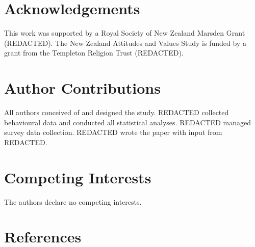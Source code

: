 \documentclass[
  man,floatsintext]{apa6}
\begin{document}
\newpage
\nolinenumbers

\hypertarget{acknowledgements}{%
\section{Acknowledgements}\label{acknowledgements}}

This work was supported by a Royal Society of New Zealand Marsden Grant (REDACTED). The New Zealand Attitudes and Values Study is funded by a grant from the Templeton Religion Trust (REDACTED).

\hypertarget{author-contributions}{%
\section{Author Contributions}\label{author-contributions}}

All authors conceived of and designed the study. REDACTED collected behavioural data and conducted all statistical analyses. REDACTED managed survey data collection. REDACTED wrote the paper with input from REDACTED.

\hypertarget{competing-interests}{%
\section{Competing Interests}\label{competing-interests}}

The authors declare no competing interests.

\newpage

\hypertarget{references}{%
\section{References}\label{references}}

\begingroup
\end{document}
